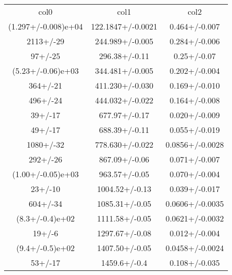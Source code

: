 \begin{table}
\begin{tabular}{ccc}
col0 & col1 & col2 \\
(1.297+/-0.008)e+04 & 122.1847+/-0.0021 & 0.464+/-0.007 \\
2113+/-29 & 244.989+/-0.005 & 0.284+/-0.006 \\
97+/-25 & 296.38+/-0.11 & 0.25+/-0.07 \\
(5.23+/-0.06)e+03 & 344.481+/-0.005 & 0.202+/-0.004 \\
364+/-21 & 411.230+/-0.030 & 0.169+/-0.010 \\
496+/-24 & 444.032+/-0.022 & 0.164+/-0.008 \\
39+/-17 & 677.97+/-0.17 & 0.020+/-0.009 \\
49+/-17 & 688.39+/-0.11 & 0.055+/-0.019 \\
1080+/-32 & 778.630+/-0.022 & 0.0856+/-0.0028 \\
292+/-26 & 867.09+/-0.06 & 0.071+/-0.007 \\
(1.00+/-0.05)e+03 & 963.57+/-0.05 & 0.070+/-0.004 \\
23+/-10 & 1004.52+/-0.13 & 0.039+/-0.017 \\
604+/-34 & 1085.31+/-0.05 & 0.0606+/-0.0035 \\
(8.3+/-0.4)e+02 & 1111.58+/-0.05 & 0.0621+/-0.0032 \\
19+/-6 & 1297.67+/-0.08 & 0.012+/-0.004 \\
(9.4+/-0.5)e+02 & 1407.50+/-0.05 & 0.0458+/-0.0024 \\
53+/-17 & 1459.6+/-0.4 & 0.108+/-0.035 \\
\end{tabular}
\end{table}

